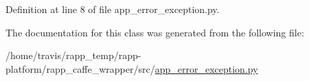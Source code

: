 Definition at line 8 of file app\-\_\-error\-\_\-exception.\-py.



The documentation for this class was generated from the following file\-:\begin{DoxyCompactItemize}
\item 
/home/travis/rapp\-\_\-temp/rapp-\/platform/rapp\-\_\-caffe\-\_\-wrapper/src/\hyperlink{rapp__caffe__wrapper_2src_2app__error__exception_8py}{app\-\_\-error\-\_\-exception.\-py}\end{DoxyCompactItemize}
